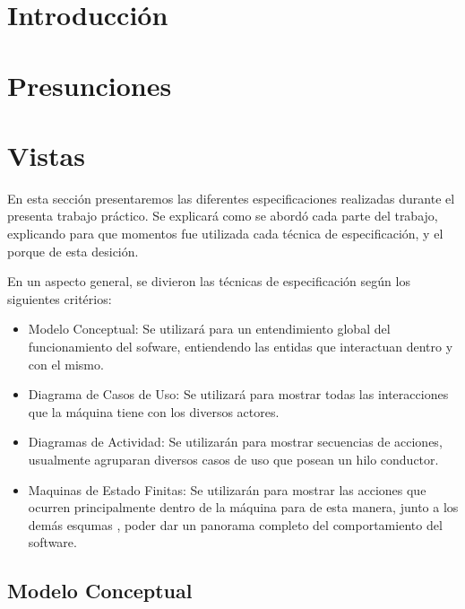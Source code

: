 \documentclass[a4paper,10pt]{article}
\begin{document}
\tableofcontents

\newpage


\section*{Introducci\'on}


\newpage
\section*{Presunciones}


\newpage


\section*{Vistas}
En esta secci\'on presentaremos las diferentes especificaciones realizadas durante el presenta trabajo pr\'actico.
Se explicar\'a como se abord\'o cada parte del trabajo, explicando para que momentos fue utilizada cada t\'ecnica de especificaci\'on, y el porque
de esta desici\'on.

En un aspecto general, se divieron las t\'ecnicas de especificaci\'on seg\'un los siguientes crit\'erios:

\begin{itemize}
\item Modelo Conceptual: Se utilizar\'a para un entendimiento global del funcionamiento del sofware, entiendendo las entidas que interactuan dentro y con el mismo.
\item Diagrama de Casos de Uso: Se utilizar\'a para mostrar todas las interacciones que la m\'aquina tiene con los diversos actores.
\item Diagramas de Actividad: Se utilizar\'an para mostrar secuencias de acciones, usualmente agruparan diversos casos de uso que posean un hilo conductor.
\item Maquinas de Estado Finitas: Se utilizar\'an para mostrar las acciones que ocurren principalmente dentro de la m\'aquina para de esta manera, junto a los dem\'as esqumas
, poder dar un panorama completo del comportamiento del software.
\end{itemize}


\bigskip

\subsection*{Modelo Conceptual}
\end{document}
